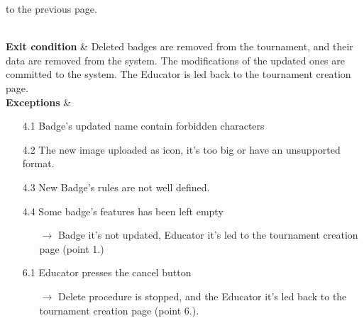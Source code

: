 \documentclass{article}
\begin{document}
{\begin{enumerate}
\begin{xltabular}{\textwidth}
\begin{enumerate}
                                                        to the previous page.
                                                    \end{enumerate} \\
                        \hline
                        \textbf{Exit condition} & Deleted badges are removed from the tournament, and their data are removed
                        from the system. The modifications of the updated ones are committed to the system. The Educator
                        is led back to the tournament creation page. \\
                        \hline
                        \textbf{Exceptions} &    \begin{itemize}
                                                    \item[4.1] Badge's updated name contain forbidden characters
                                                    \item[4.2] The new image uploaded as icon, it's too big or have an unsupported format.
                                                    \item[4.3] New Badge's rules are not well defined.
                                                    \item[4.4] Some badge's features has been left empty 
                                                    \begin{itemize}
                                                        \item[$\rightarrow$] Badge it's not updated, Educator it's led to
                                                        the tournament creation page (point 1.)
                                                    \end{itemize}
                                                    \item[6.1] Educator presses the cancel button 
                                                    \begin{itemize}
                                                        \item[$\rightarrow$] Delete procedure is stopped, and the Educator
                                                        it's led back to the tournament creation page (point 6.).
                                                    \end{itemize} 

                                                \end{itemize}
                    \end{xltabular}
                    

\end{enumerate}}
\end{document}
